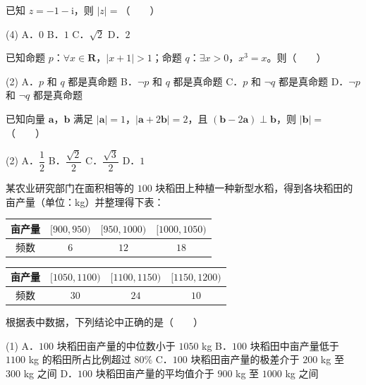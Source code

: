 \begin{question}
已知 $z=-1-\mathrm i$，则 $|z|=$\mbox{（　　）}

\begin{gkopts}(4)
\task A．$0$
\task B．$1$
\task C．$\sqrt2$
\task D．$2$
\end{gkopts}

\end{question}
\begin{question}
已知命题 $p$：$\forall x\in\mathbf R$，$|x+1|>1$；命题 $q$：$\exists x>0$，$x^{3}=x$。则\mbox{（　　）}

\begin{gkopts}(2)
\task A．$p$ 和 $q$ 都是真命题
\task B．$\neg p$ 和 $q$ 都是真命题
\task C．$p$ 和 $\neg q$ 都是真命题
\task D．$\neg p$ 和 $\neg q$ 都是真命题
\end{gkopts}

\end{question}
\begin{question}
已知向量 $\boldsymbol a$，$\boldsymbol b$ 满足 $|\boldsymbol a|=1$，$|\boldsymbol a+2\boldsymbol b|=2$，且 $(\boldsymbol b-2\boldsymbol a)\perp\boldsymbol b$，则 $|\boldsymbol b|=$\mbox{（　　）}

\begin{gkopts}(2)
\task A．$\dfrac12$
\task B．$\dfrac{\sqrt2}2$
\task C．$\dfrac{\sqrt3}2$
\task D．$1$
\end{gkopts}

\end{question}
\begin{question}
某农业研究部门在面积相等的 $100$ 块稻田上种植一种新型水稻，得到各块稻田的亩产量（单位：kg）并整理得下表：

\begin{center}
\begin{tabular}{cccc}
\toprule
亩产量 & $[900,950)$ & $[950,1000)$ & $[1000,1050)$ \\
\midrule
频数 & $6$ & $12$ & $18$ \\
\bottomrule
\end{tabular}
\end{center}

\begin{center}
\begin{tabular}{cccc}
\toprule
亩产量 & $[1050,1100)$ & $[1100,1150)$ & $[1150,1200)$ \\
\midrule
频数 & $30$ & $24$ & $10$ \\
\bottomrule
\end{tabular}
\end{center}

  根据表中数据，下列结论中正确的是\mbox{（　　）}

\begin{gkopts}(1)
\task A．$100$ 块稻田亩产量的中位数小于 $1050$ kg
\task B．$100$ 块稻田中亩产量低于 $1100$ kg 的稻田所占比例超过 $80\%$
\task C．$100$ 块稻田亩产量的极差介于 $200$ kg 至 $300$ kg 之间
\task D．$100$ 块稻田亩产量的平均值介于 $900$ kg 至 $1000$ kg 之间
\end{gkopts}

\end{question}
